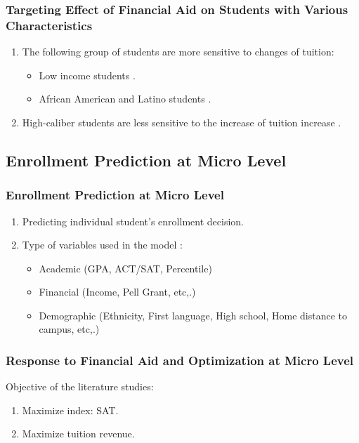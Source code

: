 \documentclass{beamer}
\begin{document}
\begin{frame}
    \frametitle{Targeting Effect of Financial Aid on Students 
    with Various Characteristics}

\begin{enumerate}
  \item The following group of students are more sensitive to 
  changes of tuition:

 \begin{itemize}
 \item Low income students \citep{Crouse2015}.
 \item  African American and Latino students \citep{Hossler1989}.
 \end{itemize}
 
\item High-caliber students are less sensitive to
 the increase of tuition increase \citep{Heller1999}.
\end{enumerate}

\end{frame}

\subsection{Enrollment Prediction at Micro Level}
\begin{frame}
    \frametitle{Enrollment Prediction at Micro Level}
    \begin{enumerate}
    \item Predicting individual student's enrollment decision.
    
    \item Type of variables used in the model \citet{Paulsen1990,Hossler1998}:
    \begin{itemize}
    \item Academic (GPA, ACT/SAT, Percentile)
    \item Financial (Income, Pell Grant, etc,.)
    \item Demographic (Ethnicity, First language, 
    High school, Home distance to campus, etc,.)
    \end{itemize}
    \end{enumerate}
\end{frame}

\begin{frame}
    \frametitle{Response to Financial Aid and Optimization at Micro 
    Level}
    Objective of the literature studies:
    \begin{enumerate}
    \item Maximize index: SAT.
      \citep{Ehrenberg1984,Sugrue2010}
    \item Maximize tuition revenue. \citep{Thanh2007} 
    \end{enumerate}
\end{frame}
\end{document}
